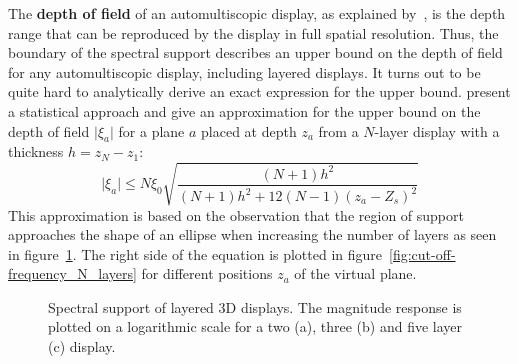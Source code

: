 The \textbf{depth of field} of an automultiscopic display, as explained by~\cite{Antialiasingfor3DDisplays}, is the depth range that can be reproduced by the display in full spatial resolution.
Thus, the boundary of the spectral support describes an upper bound on the depth of field for any automultiscopic display, including layered displays.
It turns out to be quite hard to analytically derive an exact expression for the upper bound.
\cite{WetzsteinTomo} present a statistical approach and give an approximation for the upper bound on the depth of field $\lvert \xi_a \rvert$ for a plane $a$ placed at depth $z_a$ from a \mbox{$N$-layer} display with a thickness $h = z_N - z_1$:
\begin{equation}\label{eq:approx_upper_bound_spatial_cut_off}
	\lvert \xi_a \rvert \leq N \xi_0 \sqrt{ \frac{(N + 1) h^2}{(N + 1) h^2 + 12(N - 1)(z_a - Z_s)^2} }
\end{equation}
This approximation is based on the observation that the region of support approaches the shape of an ellipse when increasing the number of layers as seen in figure~\ref{fig:magnitude_response_2_3_5_layers}.
The right side of the equation is plotted in figure~\ref{fig:cut-off-frequency_N_layers} for different positions $z_a$ of the virtual plane.
\begin{figure}[tb]
	\hfill%
	\hfill%
	\caption[Spectral support of layered 3D displays]
			{Spectral support of layered 3D displays. 
			 The magnitude response is plotted on a logarithmic scale for a two (a), three (b) and five layer (c) display.}
	\label{fig:magnitude_response_2_3_5_layers}
\end{figure}

